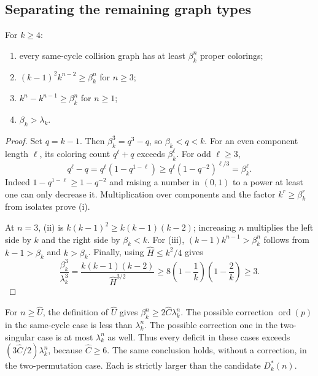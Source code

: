 \documentclass[11pt,a4paper]{article}
\numberwithin{equation}{section}
\theoremstyle{definition}
\theoremstyle{remark}
\newcommand{\ord}{\operatorname{ord}}
\begin{document}
\subsection{Separating the remaining graph types}

\begin{lemma}[Manuscript~06]\label{evo:lem:betabounds}
For $k\ge4$:
\begin{enumerate}[label=(\roman*)]
\item every same-cycle collision graph has at least $\beta_k^n$ proper
colorings;
\item $(k-1)^2k^{n-2}\ge\beta_k^n$ for $n\ge3$;
\item $k^n-k^{n-1}\ge\beta_k^n$ for $n\ge1$;
\item $\beta_k>\lambda_k$.
\end{enumerate}
\end{lemma}
\begin{proof}
Set $q=k-1$. Then $\beta_k^3=q^3-q$, so $\beta_k<q<k$. For an even component
length $\ell$, its coloring count $q^\ell+q$ exceeds $\beta_k^\ell$. For odd
$\ell\ge3$,
\[
 q^\ell-q=q^\ell(1-q^{1-\ell})\ge q^\ell(1-q^{-2})^{\ell/3}=\beta_k^\ell.
\]
Indeed $1-q^{1-\ell}\ge1-q^{-2}$ and raising a number in $(0,1)$ to a power at
least one can only decrease it. Multiplication over components and the factor
$k^r\ge\beta_k^r$ from isolates prove (i).

At $n=3$, (ii) is $k(k-1)^2\ge k(k-1)(k-2)$; increasing $n$ multiplies the
left side by $k$ and the right side by $\beta_k<k$. For (iii),
$(k-1)k^{n-1}>\beta_k^n$ follows from $k-1>\beta_k$ and $k>\beta_k$. Finally,
using $\hat H\le k^2/4$ gives
\begin{equation}\label{evo:eq:betaratio}
 \frac{\beta_k^3}{\lambda_k^3}
 =\frac{k(k-1)(k-2)}{\hat H^{3/2}}
 \ge8\left(1-\frac1k\right)\left(1-\frac2k\right)\ge3.
\end{equation}
\end{proof}

For $n\ge\hat U$, the definition of $\hat U$ gives
$\beta_k^n\ge2\hat C\lambda_k^n$. The possible correction $\ord(p)$ in the
same-cycle case is less than $\lambda_k^n$. The possible correction one in
the two-singular case is at most $\lambda_k^n$ as well. Thus every deficit in
these cases exceeds $(3\hat C/2)\lambda_k^n$, because $\hat C\ge6$. The same
conclusion holds, without a correction, in the two-permutation case. Each is
strictly larger than the candidate $D^*_k(n)$.
\end{document}
